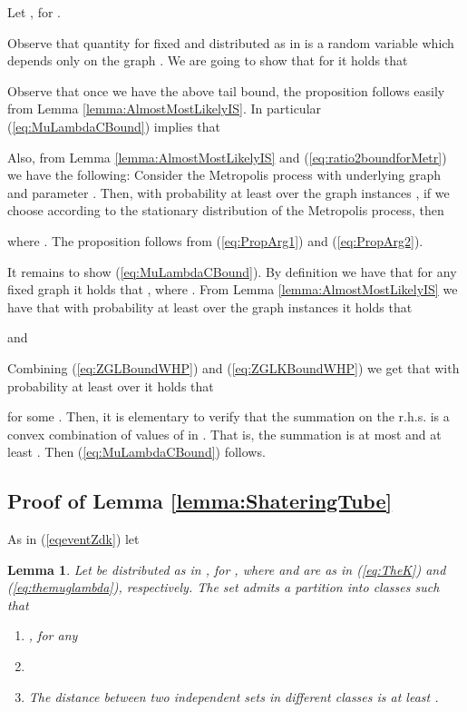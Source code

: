 \documentclass[a4paper,10pt]{article}
\makeatletter
\newtheorem{lemma}{Lemma}\renewcommand{\thelemma}{\arabic{lemma}}
\newenvironment{propositionproof}[1]{\noindent{\bf Proof of Proposition #1\@:}}{\hfill \\}
\makeatother
\begin{document}
\begin{propositionproof}{\ref{prop:MostLikelyIS}}
Let , for .

Observe that quantity  for fixed  and
 distributed as in  is a random variable which depends
only on the graph .
We are going to show that for  it holds that

Observe that once we have the above tail bound,  the proposition
follows easily from Lemma \ref{lemma:AlmostMostLikelyIS}. In particular
(\ref{eq:MuLambdaCBound}) implies that 

Also, from Lemma \ref{lemma:AlmostMostLikelyIS} and (\ref{eq:ratio2boundforMetr})
we have the following: 
Consider the Metropolis process with underlying graph 
and parameter . Then, with probability at least 
over the graph instances , if we choose  according
to the stationary distribution of the Metropolis process, then 

where .
The proposition follows from (\ref{eq:PropArg1}) and (\ref{eq:PropArg2}).

It remains to show (\ref{eq:MuLambdaCBound}). By definition we have
that for any fixed graph  it holds that 
,
where . From Lemma
\ref{lemma:AlmostMostLikelyIS} we have that with probability at least
 over the graph instances  
it holds that

and 

Combining (\ref{eq:ZGLBoundWHP}) and (\ref{eq:ZGLKBoundWHP})
we get that with probability at least 
over  it holds that

for some . Then, it is elementary to verify that
the summation on the r.h.s. is a convex combination of values of  in
. That is, the summation is at most  and at 
least . Then (\ref{eq:MuLambdaCBound}) follows.
\end{propositionproof}





\subsection{Proof of Lemma \ref{lemma:ShateringTube}}\label{sec:lemma:ShateringTube}


As in (\ref{eqeventZdk}) let 



\begin{lemma}\label{lemma:ShateringTubeTest}
Let  be distributed as in ,
for , where  and  are as in (\ref{eq:TheK}) and 
(\ref{eq:themuglambda}), respectively.
The set  admits a partition into classes 
 such that
\begin{enumerate}
\item , for any 
\item 
\item The distance between two independent sets in different classes is at least .
\end{enumerate}
\end{lemma}
\end{document}
